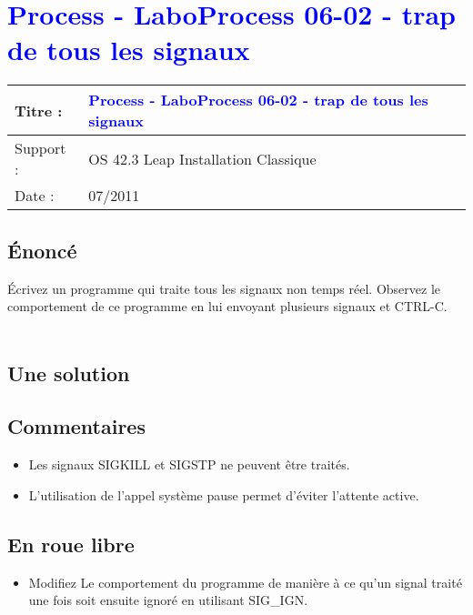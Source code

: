 \lstset{language=c}
\renewcommand{\titre}{\textcolor{blue}{ Process - LaboProcess 06-02 - trap de tous les signaux }}

\lhead{ \titre }
\section{{\titre} }

\begin{tabular}{|l|l|}
\hline
Titre : 	& \titre \\\hline
Support : 	& OS 42.3 Leap Installation Classique \\\hline
Date :		& 07/2011 \\\hline
\end{tabular}

\subsection{Énoncé}
Écrivez un programme qui traite tous les signaux non temps réel. 
Observez le comportement de ce programme en lui envoyant plusieurs signaux et CTRL-C.\\ 
\\

\subsection{Une solution}



\subsection{Commentaires}

\begin{itemize}
\item Les signaux SIGKILL et SIGSTP ne peuvent être traités.
\item L'utilisation de l'appel système pause permet d'éviter l'attente active.
\end{itemize}

\subsection{En roue libre}
\begin{itemize}
\item Modifiez Le comportement du programme de manière à ce qu'un signal traité une fois soit ensuite ignoré en utilisant SIG\_IGN.
\end{itemize}
\newpage
